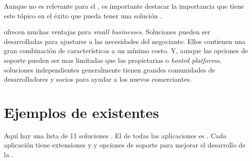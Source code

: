 Aunque no es relevante para el \framework, es importante destacar la importancia que tiene este tópico en el éxito que pueda tener una solución \ecommerce. 



\opensource \ecommerce \shoppingcarts ofrecen muchas ventajas para \textit{small businesses}. Soluciones \opensource pueden ser desarrolladas para ajustarse a las necesidades del negociante. Ellos contienen una gran combinación de características a un mínimo costo. Y, aunque las opciones de soporte pueden ser mas limitadas que las propietarias o \textit{hosted platforms}, soluciones independientes \opensource generalmente tienen grandes comunidades de desarrolladores y socios para ayudar a los nuevos comerciantes.

\section{Ejemplos de \frameworks \ecommerce existentes}

Aquí hay una lista de 11 soluciones \ecommerce \opensource. El \core de todas las aplicaciones es \free. Cada aplicación tiene extensiones \free y \premium y opciones de soporte para mejorar el desarrollo de la \store.

